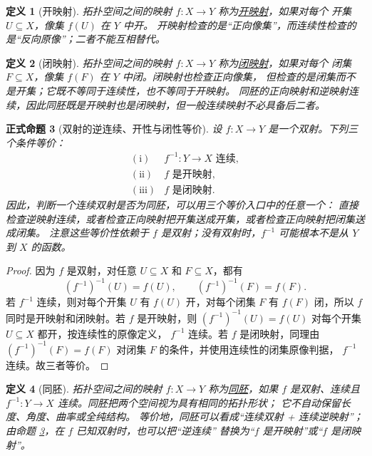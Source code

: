 \documentclass[UTF8,fontset=none,a4paper,11pt]{ctexart}
\theoremstyle{foundation-definition}
\newtheorem{definition}{定义}[section]
\theoremstyle{foundation-theorem}
\theoremstyle{foundation-proposition}
\newtheorem{proposition}[definition]{正式命题}
\theoremstyle{foundation-example}
\theoremstyle{foundation-remark}
\theoremstyle{foundation-theorem}
\newcommand{\term}[2]{\hyperref[#1]{#2}}
\begin{document}
\begin{definition}[开映射]\label{def:open-map}
拓扑空间之间的映射 \(f:X\to Y\) 称为\term{def:open-map}{开映射}，如果对每个
开集 \(U\subseteq X\)，像集 \(f(U)\) 在 \(Y\) 中开。
开映射检查的是“正向像集”，而连续性检查的是“反向原像”；二者不能互相替代。
\end{definition}

\begin{definition}[闭映射]\label{def:closed-map}
拓扑空间之间的映射 \(f:X\to Y\) 称为\term{def:closed-map}{闭映射}，如果对每个
闭集 \(F\subseteq X\)，像集 \(f(F)\) 在 \(Y\) 中闭。闭映射也检查正向像集，
但检查的是闭集而不是开集；它既不等同于连续性，也不等同于开映射。
同胚的正向映射和逆映射连续，因此同胚既是开映射也是闭映射，但一般连续映射不必具备后二者。
\end{definition}

\begin{proposition}[双射的逆连续、开性与闭性等价]\label{prop:bijective-topological-equivalences}
设 \(f:X\to Y\) 是一个双射。下列三个条件等价：
\[
\begin{array}{rcl}
(\mathrm{i})& f^{-1}:Y\to X\text{ 连续},\\
(\mathrm{ii})& f\text{ 是开映射},\\
(\mathrm{iii})& f\text{ 是闭映射}.
\end{array}
\]
因此，判断一个连续双射是否为同胚，可以用三个等价入口中的任意一个：
直接检查逆映射连续，或者检查正向映射把开集送成开集，或者检查正向映射把闭集送成闭集。
注意这些等价性依赖于 \(f\) 是双射；没有双射时，\(f^{-1}\) 可能根本不是从 \(Y\) 到 \(X\) 的函数。
\end{proposition}

\begin{proof}
因为 \(f\) 是双射，对任意 \(U\subseteq X\) 和 \(F\subseteq X\)，都有
\[
  (f^{-1})^{-1}(U)=f(U),\qquad
  (f^{-1})^{-1}(F)=f(F).
\]
若 \(f^{-1}\) 连续，则对每个开集 \(U\) 有 \(f(U)\) 开，对每个闭集 \(F\) 有
\(f(F)\) 闭，所以 \(f\) 同时是开映射和闭映射。若 \(f\) 是开映射，则
\((f^{-1})^{-1}(U)=f(U)\) 对每个开集 \(U\subseteq X\) 都开，按连续性的原像定义，
\(f^{-1}\) 连续。若 \(f\) 是闭映射，同理由
\((f^{-1})^{-1}(F)=f(F)\) 对闭集 \(F\) 的条件，并使用连续性的闭集原像判据，
\(f^{-1}\) 连续。故三者等价。
\end{proof}

\begin{definition}[同胚]\label{def:homeomorphism}
拓扑空间之间的映射 \(f:X\to Y\) 称为\term{def:homeomorphism}{同胚}，如果
\(f\) 是双射、连续且 \(f^{-1}:Y\to X\) 连续。同胚把两个空间视为具有相同的拓扑形状；
它不自动保留长度、角度、曲率或全纯结构。
等价地，同胚可以看成“连续双射 + 连续逆映射”；由命题
\ref{prop:bijective-topological-equivalences}，在 \(f\) 已知双射时，也可以把“逆连续”
替换为“\(f\) 是开映射”或“\(f\) 是闭映射”。
\end{definition}
\end{document}
